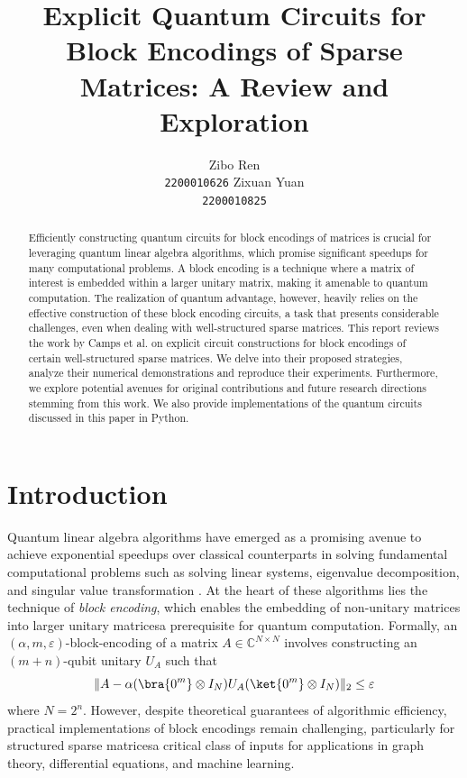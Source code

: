 \documentclass{article}
\title{Explicit Quantum Circuits for Block Encodings of Sparse Matrices: A Review and Exploration}
\author{%
  \large Zibo Ren \\
  \large \texttt{2200010626}
  \And
  \large Zixuan Yuan \\
  \large \texttt{2200010825}
}
\begin{document}
\maketitle

\begin{abstract}

  Efficiently constructing quantum circuits for block encodings of matrices is crucial for leveraging quantum linear algebra algorithms, which promise significant speedups for many computational problems.
  A block encoding is a technique where a matrix of interest is embedded within a larger unitary matrix, making it amenable to quantum computation.
  The realization of quantum advantage, however, heavily relies on the effective construction of these block encoding circuits, a task that presents considerable challenges, even when dealing with well-structured sparse matrices.
  This report reviews the work by Camps et al. \cite{EQC} on explicit circuit constructions for block encodings of certain well-structured sparse matrices.
  We delve into their proposed strategies, analyze their numerical demonstrations and reproduce their experiments.
  Furthermore, we explore potential avenues for original contributions and future research directions stemming from this work.
  We also provide implementations of the quantum circuits discussed in this paper in Python.

\end{abstract}

\section{Introduction}

Quantum linear algebra algorithms have emerged as a promising avenue to achieve exponential speedups over classical counterparts in solving fundamental computational problems such as solving linear systems, eigenvalue decomposition, and singular value transformation \cite{EQC}. At the heart of these algorithms lies the technique of \emph{block encoding}, which enables the embedding of non-unitary matrices into larger unitary matrices\textemdash a prerequisite for quantum computation. Formally, an $(\alpha, m, \varepsilon)$-block-encoding of a matrix $A \in \mathbb{C}^{N \times N}$ involves constructing an $(m+n)$-qubit unitary $U_A$ such that
\begin{equation}
  \|A - \alpha(\bra{0^m} \otimes I_N)U_A(\ket{0^m} \otimes I_N)\|_2 \leq \varepsilon
\end{equation}
where $N=2^n$. However, despite theoretical guarantees of algorithmic efficiency, practical implementations of block encodings remain challenging, particularly for structured sparse matrices\textemdash a critical class of inputs for applications in graph theory, differential equations, and machine learning.
\end{document}
